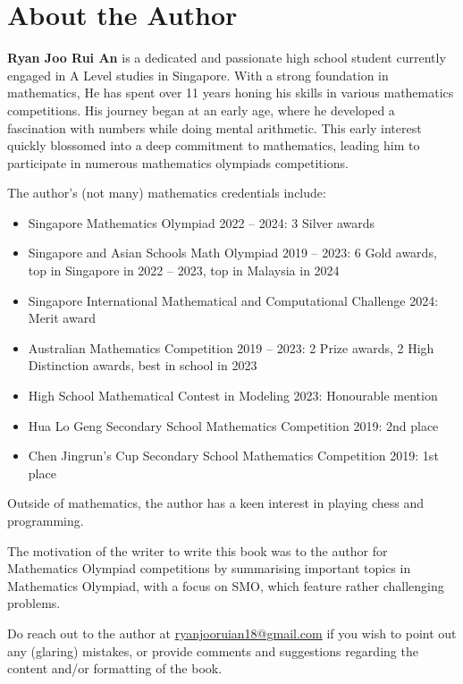 \section*{About the Author}
\textbf{\sffamily Ryan Joo Rui An} is a dedicated and passionate high school student currently engaged in A Level studies in Singapore. With a strong foundation in mathematics, He has spent over 11 years honing his skills in various mathematics competitions. His journey began at an early age, where he developed a fascination with numbers while doing mental arithmetic. This early interest quickly blossomed into a deep commitment to mathematics, leading him to participate in numerous mathematics olympiads competitions.

The author's (not many) mathematics credentials include:
\begin{itemize}
\item Singapore Mathematics Olympiad 2022 -- 2024: 3 Silver awards
\item Singapore and Asian Schools Math Olympiad 2019 -- 2023: 6 Gold awards, top in Singapore in 2022 -- 2023, top in Malaysia in 2024
\item Singapore International Mathematical and Computational Challenge 2024: Merit award
\item Australian Mathematics Competition 2019 -- 2023: 2 Prize awards, 2 High Distinction awards, best in school in 2023
\item High School Mathematical Contest in Modeling 2023: Honourable mention
\item Hua Lo Geng Secondary School Mathematics Competition 2019: 2nd place
\item Chen Jingrun's Cup Secondary School Mathematics Competition 2019: 1st place
\end{itemize}

Outside of mathematics, the author has a keen interest in playing chess and programming.

The motivation of the writer to write this book was to the author for Mathematics Olympiad competitions by summarising important topics in Mathematics Olympiad, with a focus on SMO, which feature rather challenging problems.

Do reach out to the author at \href{mailto:ryanjooruian18@gmail.com}{ryanjooruian18@gmail.com} if you wish to point out any (glaring) mistakes, or provide comments and suggestions regarding the content and/or formatting of the book.